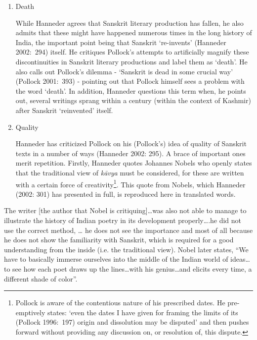 \begin{enumerate}
\item Death 

 While Hanneder agrees that Sanskrit literary production has fallen, he also admits that these might have happened numerous times in the long history of India, the important point being that Sanskrit ‘re-invents’ (Hanneder 2002:~294) itself. He critiques Pollock’s attempts to artificially magnify these discontinuities in Sanskrit literary productions and label them as ‘death’. He also calls out Pollock’s dilemma - ‘Sanskrit is dead in some crucial way’ (Pollock 2001:~393) - pointing out that Pollock himself sees a problem with the word ‘death’. In addition, Hanneder questions this term when, he points out, several writings sprang within a century (within the context of Kashmir) after Sanskrit ‘reinvented’ itself.

 \item Quality 
 
 Hanneder has criticized Pollock on his (Pollock’s) idea of quality of Sanskrit texts in a number of ways (Hanneder 2002: 295). A brace of important ones merit repetition. Firstly, Hanneder quotes Johannes Nobels who openly states that the traditional view of \textit{kāvya} must be considered, for these are written with a certain force of creativity\footnote{ Pollock is aware of the contentious nature of his prescribed dates. He pre-emptively states: ‘even the dates I have given for framing the limits of its (Pollock 1996:~197) origin and dissolution may be disputed’ and then pushes forward without providing any discussion on, or resolution of, this dispute.}. This quote from Nobels, which Hanneder (2002: 301) has presented in full, is reproduced here in translated words.
\end{enumerate}

\begin{myquote}
The writer [the author that Nobel is critiquing]…was also not able to manage to illustrate the history of Indian poetry in its development properly….he did not use the correct method, … he does not see the importance and most of all because he does not show the familiarity with Sanskrit, which is required for a good understanding from the inside (i.e. the traditional view). Nobel later states, “We have to basically immerse ourselves into the middle of the Indian world of ideas…to see how each poet draws up the lines…with his genius…and elicits every time, a different shade of color”.
\end{myquote}

